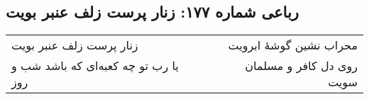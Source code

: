 \begin{center}
\section*{رباعی شماره ۱۷۷: زنار پرست زلف عنبر بویت}
\label{sec:sh177}
\begin{longtable}{l p{0.5cm} r}
زنار پرست زلف عنبر بویت
&&
محراب نشین گوشهٔ ابرویت
\\
یا رب تو چه کعبه‌ای که باشد شب و روز
&&
روی دل کافر و مسلمان سویت
\\
\end{longtable}
\end{center}
